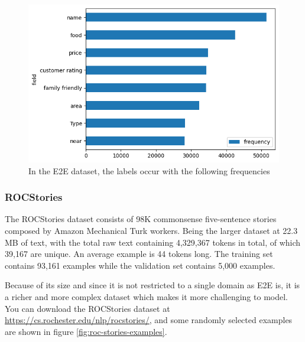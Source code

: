 \begin{figure}[h]
  \includegraphics[scale=0.6]{images/e2e-field-frequencies.png}
  \centering
  \caption{In the E2E dataset, the labels occur with the following frequencies}
  \label{fig:e2e-field-frequencies}
\end{figure}

\subsubsection{ROCStories}

The ROCStories\cite{mostafazadeh2016corpus} dataset consists of 98K commonsense five-sentence stories composed by Amazon Mechanical Turk workers. Being the larger dataset at 22.3 MB of text, with the total raw text containing 4,329,367 tokens in total, of which 39,167 are unique. An average example is 44 tokens long. The training set contains 93,161 examples while the validation set contains 5,000 examples.

Because of its size and since it is not restricted to a single domain as E2E is, it is a richer and more complex dataset which makes it more challenging to model. You can download the ROCStories dataset at \href{https://cs.rochester.edu/nlp/rocstories/}{https://cs.rochester.edu/nlp/rocstories/}, and some randomly selected examples are shown in figure \ref{fig:roc-stories-examples}.


